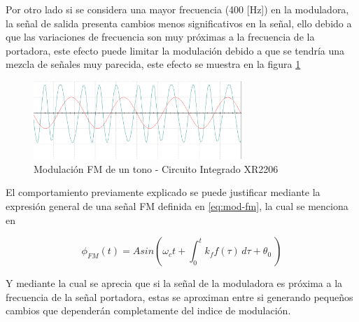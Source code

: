 \documentclass[conference]{IEEEtran}
\begin{document}
	Por otro lado si se considera una mayor frecuencia (400 [Hz]) en la moduladora, la señal de salida presenta cambios menos significativos en la señal, ello debido a que las variaciones de frecuencia son muy próximas a la frecuencia de la portadora, este efecto puede limitar la modulación debido a que se tendría una mezcla de señales muy parecida, este efecto se muestra en la figura \ref{fig:mod-fm-circuito-400}
	
	\begin{figure}[h]
		\centering
		\includegraphics[width=0.7\textwidth]{media/mod-fm-circuito-400}
		\caption{Modulación FM de un tono - Circuito Integrado XR2206}
		\label{fig:mod-fm-circuito-400}
	\end{figure}
	
	El comportamiento previamente explicado se puede justificar mediante la expresión general de una señal FM definida en \ref{eq:mod-fm}, la cual se menciona en \cite{stremler2006}
	
	\begin{equation}
		\phi_{FM}(t) = Asin( \omega_c t + \int_0^t k_f f(\tau)\, d\tau + \theta_0\ )
		\label{eq:mod-fm}
	\end{equation}
	
	Y mediante la cual se aprecia que si la señal de la moduladora es próxima a la frecuencia de la señal portadora, estas se aproximan entre si generando pequeños cambios que dependerán completamente del indice de modulación.
	
	
	
	
	
	
\end{document}
